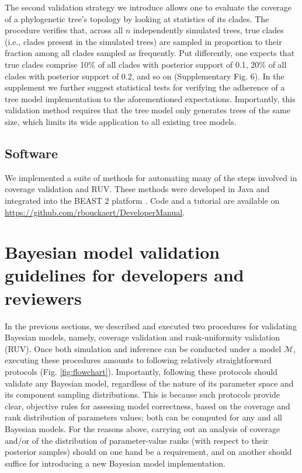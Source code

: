 \documentclass[oneside]{article}
\begin{document}
The second validation strategy we introduce allows one to evaluate the coverage of a phylogenetic tree's topology by looking at statistics of its clades.
The procedure verifies that, across all $n$ independently simulated trees, true clades (i.e., clades present in the simulated trees) are sampled in proportion to their fraction among all clades sampled as frequently.
Put differently, one expects that true clades comprise 10\% of all clades with posterior support of 0.1, 20\% of all clades with posterior support of 0.2, and so on (Supplementary Fig. 6).
In the supplement we further suggest statistical tests for verifying the adherence of a tree model implementation to the aforementioned expectations.
Importantly, this validation method requires that the tree model only generates trees of the same size, which limits its wide application to all existing tree models.

\subsection*{Software}

We implemented a suite of methods for automating many of the steps involved in coverage validation and RUV.
These methods were developed in Java and integrated into the BEAST 2 platform \citep{beast25}.
Code and a tutorial are available on \href{https://github.com/rbouckaert/DeveloperManual}{https://github.com/rbouckaert/DeveloperManual}.


\section*{Bayesian model validation guidelines for developers and reviewers}

In the previous sections, we described and executed two procedures for validating Bayesian models, namely, coverage validation and rank-uniformity validation (RUV).
Once both simulation and inference can be conducted under a model $\mathcal{M}$, executing these procedures amounts to following relatively straightforward protocols (Fig. \ref{fig:flowchart}).
Importantly, following these protocols should validate any Bayesian model, regardless of the nature of its parameter space and its component sampling distributions.
This is because such protocols provide clear, objective rules for assessing model correctness, based on the coverage and rank distribution of parameters values; both can be computed for any and all Bayesian models.
For the reasons above, carrying out an analysis of coverage and/or of the distribution of parameter-value ranks (with respect to their posterior samples) should on one hand be a requirement, and on another should suffice for introducing a new Bayesian model implementation.
\end{document}
